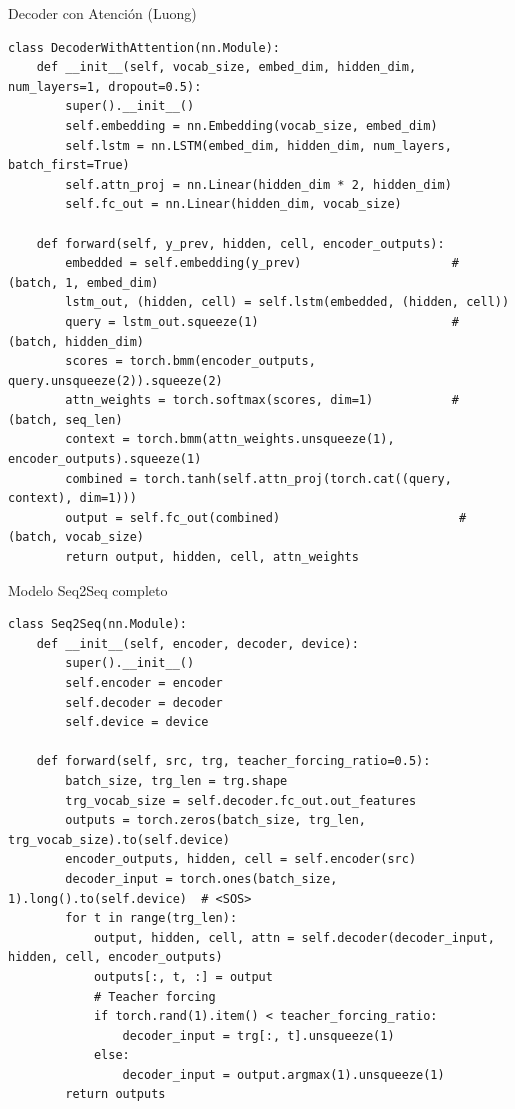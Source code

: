 \documentclass[aspectratio=169, 10pt, xcolor=table]{beamer}
\begin{document}
\begin{frame}[fragile]{Decoder con Atención (Luong)}
    \begin{lstlisting}
class DecoderWithAttention(nn.Module):
    def __init__(self, vocab_size, embed_dim, hidden_dim, num_layers=1, dropout=0.5):
        super().__init__()
        self.embedding = nn.Embedding(vocab_size, embed_dim)
        self.lstm = nn.LSTM(embed_dim, hidden_dim, num_layers, batch_first=True)
        self.attn_proj = nn.Linear(hidden_dim * 2, hidden_dim)
        self.fc_out = nn.Linear(hidden_dim, vocab_size)

    def forward(self, y_prev, hidden, cell, encoder_outputs):
        embedded = self.embedding(y_prev)                     # (batch, 1, embed_dim)
        lstm_out, (hidden, cell) = self.lstm(embedded, (hidden, cell))
        query = lstm_out.squeeze(1)                           # (batch, hidden_dim)
        scores = torch.bmm(encoder_outputs, query.unsqueeze(2)).squeeze(2)
        attn_weights = torch.softmax(scores, dim=1)           # (batch, seq_len)
        context = torch.bmm(attn_weights.unsqueeze(1), encoder_outputs).squeeze(1)
        combined = torch.tanh(self.attn_proj(torch.cat((query, context), dim=1)))
        output = self.fc_out(combined)                         # (batch, vocab_size)
        return output, hidden, cell, attn_weights
    \end{lstlisting}
\end{frame}

\begin{frame}[fragile]{Modelo Seq2Seq completo}
    \begin{lstlisting}
class Seq2Seq(nn.Module):
    def __init__(self, encoder, decoder, device):
        super().__init__()
        self.encoder = encoder
        self.decoder = decoder
        self.device = device

    def forward(self, src, trg, teacher_forcing_ratio=0.5):
        batch_size, trg_len = trg.shape
        trg_vocab_size = self.decoder.fc_out.out_features
        outputs = torch.zeros(batch_size, trg_len, trg_vocab_size).to(self.device)
        encoder_outputs, hidden, cell = self.encoder(src)
        decoder_input = torch.ones(batch_size, 1).long().to(self.device)  # <SOS>
        for t in range(trg_len):
            output, hidden, cell, attn = self.decoder(decoder_input, hidden, cell, encoder_outputs)
            outputs[:, t, :] = output
            # Teacher forcing
            if torch.rand(1).item() < teacher_forcing_ratio:
                decoder_input = trg[:, t].unsqueeze(1)
            else:
                decoder_input = output.argmax(1).unsqueeze(1)
        return outputs
    \end{lstlisting}
\end{frame}
\end{document}
